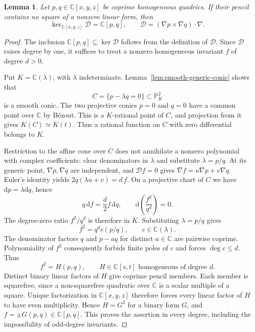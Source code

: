 \documentclass[11pt,reqno]{amsart}
\numberwithin{equation}{section}
\theoremstyle{plain}
\newtheorem{lemma}[theorem]{Lemma}
\theoremstyle{definition}
\theoremstyle{remark}
\newcommand{\C}{\mathbb C}
\newcommand{\PP}{\mathbb P}
\newcommand{\Ker}{\operatorname{ker}}
\newcommand{\dd}{\mathrm d}
\newcommand{\calD}{\mathcal D}
\begin{document}
\begin{lemma}\label{lem:pencil-invariants}
Let $p,q\in\C[x,y,z]$ be coprime homogeneous quadrics. If their pencil contains no square of a nonzero linear form, then
\[
\Ker_{\C[x,y,z]}\calD=\C[p,q],\qquad
\calD=(\nabla p\times\nabla q)\cdot\nabla.
\]
\end{lemma}
\begin{proof}
The inclusion $\C[p,q]\subseteq\Ker\calD$ follows from the definition of $\calD$.
Since $\calD$ raises degree by one, it suffices to treat a nonzero homogeneous invariant $f$ of degree $d>0$.

Put $K=\C(\lambda)$, with $\lambda$ indeterminate. Lemma~\ref{lem:smooth-generic-conic} shows that
\[
C=\{p-\lambda q=0\}\subset\PP^2_K
\]
is a smooth conic.
The two projective conics $p=0$ and $q=0$ have a common point over $\C$ by B\'ezout. This is a $K$-rational point of $C$, and projection from it gives $K(C)\simeq K(t)$.
Thus a rational function on $C$ with zero differential belongs to $K$.

Restriction to the affine cone over $C$ does not annihilate a nonzero polynomial with complex coefficients: clear denominators in $\lambda$ and substitute $\lambda=p/q$.
At its generic point, $\nabla p,\nabla q$ are independent, and $\calD f=0$ gives
$\nabla f=u\nabla p+v\nabla q$.
Euler's identity yields $2q(\lambda u+v)=d\,f$.
On a projective chart of $C$ we have $\dd p=\lambda\dd q$, hence
\begin{equation}\label{eq:homogeneous-invariant}
q\,\dd f=\frac d2 f\,\dd q,
\qquad
\dd\left(\frac{f^2}{q^d}\right)=0.
\end{equation}
The degree-zero ratio $f^2/q^d$ is therefore in $K$.
Substituting $\lambda=p/q$ gives
\[
f^2=q^d c(p/q),\qquad c\in\C(\lambda).
\]
The denominator factors $q$ and $p-aq$ for distinct $a\in\C$ are pairwise coprime. Polynomiality of $f^2$ consequently forbids finite poles of $c$ and forces $\deg c\le d$.
Thus
\[
f^2=H(p,q),\qquad H\in\C[s,t]\text{ homogeneous of degree }d.
\]
Distinct binary linear factors of $H$ give coprime pencil members.
Each member is squarefree, since a non-squarefree quadratic over $\C$ is a scalar multiple of a square.
Unique factorization in $\C[x,y,z]$ therefore forces every linear factor of $H$ to have even multiplicity.
Hence $H=G^2$ for a binary form $G$, and $f=\pm G(p,q)\in\C[p,q]$.
This proves the assertion in every degree, including the impossibility of odd-degree invariants.
\end{proof}
\end{document}
